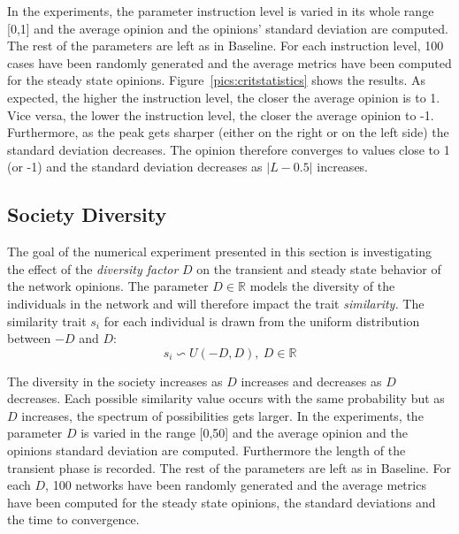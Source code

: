 In the experiments, the parameter instruction level is varied in its whole range [0,1] and the average opinion and the opinions' standard deviation are computed. The rest of the parameters are left as in Baseline. For each instruction level, 100 cases have been randomly generated and the average metrics have been computed for the steady state opinions.
Figure~\ref{pics:critstatistics} shows the results. As expected, the higher the instruction level, the closer the average opinion is to 1. Vice versa, the lower the instruction level, the closer the average opinion to -1. Furthermore, as the peak gets sharper (either on the right or on the left side) the standard deviation decreases. The opinion therefore converges to values close to 1 (or -1) and the standard deviation decreases as $|L-0.5|$ increases. 
\subsection{Society Diversity}
\label{sec:diversity}
The goal of the numerical experiment presented in this section is investigating the effect of the \textit{diversity factor} $D$ on the transient and steady state behavior of the network opinions. The parameter $D \in \mathbb{R}$ models the diversity of the individuals in the network and will therefore impact the trait \textit{similarity.}
The similarity trait $s_i$ for each individual is drawn from the uniform distribution between $-D$ and $D$:
$$
s_i \backsim U(-D, D),\ D \in \mathbb{R}
$$

The diversity in the society increases as $D$ increases and decreases as $D$ decreases. Each possible similarity value occurs with the same probability but as $D$ increases, the spectrum of possibilities gets larger. \newline
In the experiments, the parameter $D$ is varied in the range [0,50] and the average opinion and the opinions standard deviation are computed. Furthermore the length of the transient phase is recorded. The rest of the parameters are left as in Baseline. For each $D$, 100 networks have been randomly generated and the average metrics have been computed for the steady state opinions, the standard deviations and the time to convergence. 

